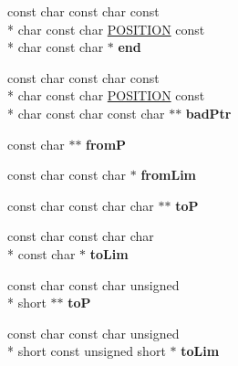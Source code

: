 \begin{DoxyCompactItemize}
\item 
\hypertarget{structencoding_a049c4d9fc04216e6368851a75c7dd414}{const char const char const \\*
char const char \hyperlink{structposition}{P\-O\-S\-I\-T\-I\-O\-N} const \\*
char const char $\ast$ {\bfseries end}}\label{structencoding_a049c4d9fc04216e6368851a75c7dd414}

\item 
\hypertarget{structencoding_a3842477d4481d822ee608c01b1d99e16}{const char const char const \\*
char const char \hyperlink{structposition}{P\-O\-S\-I\-T\-I\-O\-N} const \\*
char const char const char $\ast$$\ast$ {\bfseries bad\-Ptr}}\label{structencoding_a3842477d4481d822ee608c01b1d99e16}

\item 
\hypertarget{structencoding_a360cf1537ca9bd86b123b8b323fe8433}{const char $\ast$$\ast$ {\bfseries from\-P}}\label{structencoding_a360cf1537ca9bd86b123b8b323fe8433}

\item 
\hypertarget{structencoding_a51d2a830b3a5f30129f7140209e6800f}{const char const char $\ast$ {\bfseries from\-Lim}}\label{structencoding_a51d2a830b3a5f30129f7140209e6800f}

\item 
\hypertarget{structencoding_ab10b959825711c5280c0f9cc2a491c5d}{const char const char char $\ast$$\ast$ {\bfseries to\-P}}\label{structencoding_ab10b959825711c5280c0f9cc2a491c5d}

\item 
\hypertarget{structencoding_ad121e4388d5369e25c2d8e5f2d0bc036}{const char const char char \\*
const char $\ast$ {\bfseries to\-Lim}}\label{structencoding_ad121e4388d5369e25c2d8e5f2d0bc036}

\item 
\hypertarget{structencoding_af00d6198ca0eb6034520f814d6972dfd}{const char const char unsigned \\*
short $\ast$$\ast$ {\bfseries to\-P}}\label{structencoding_af00d6198ca0eb6034520f814d6972dfd}

\item 
\hypertarget{structencoding_a9f2d8e508359a95de3a19e34da249fd8}{const char const char unsigned \\*
short const unsigned short $\ast$ {\bfseries to\-Lim}}\label{structencoding_a9f2d8e508359a95de3a19e34da249fd8}


\end{DoxyCompactItemize}
